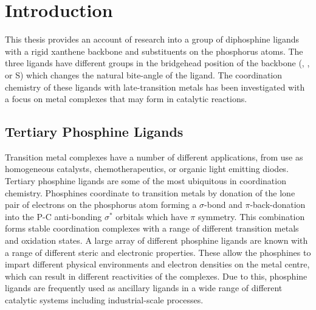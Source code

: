 
\chapter{Introduction}
\label{chapter:introduction}

This thesis provides an account of research into a group of diphosphine ligands with a rigid xanthene backbone and \tBu{} substituents on the phosphorus atoms.  The three ligands have different groups in the bridgehead position of the backbone (, , or S) which changes the natural bite-angle of the ligand.  The coordination chemistry of these \tBuxantphos{} ligands with late-transition metals has been investigated with a focus on metal complexes that may form in catalytic reactions.




\section{Tertiary Phosphine Ligands}

Transition metal complexes have a number of different applications, from use as homogeneous catalysts, chemotherapeutics, or organic light emitting diodes.\cite{Lamansky2001, Rosenberg1969, Wilson2013}  Tertiary phosphine ligands are some of the most ubiquitous in coordination chemistry.  Phosphines coordinate to transition metals by donation of the lone pair of electrons on the phosphorus atom forming a $\sigma$-bond and $\pi$-back-donation into the P-C anti-bonding $\sigma^*$ orbitals which have $\pi$ symmetry.\cite{Orpen1990}  This combination forms stable coordination complexes with a range of different transition metals and oxidation states.  A large array of different phosphine ligands are known with a range of different steric and electronic properties.  These allow the phosphines to impart different physical environments and electron densities on the metal centre, which can result in different reactivities of the complexes.  Due to this, phosphine ligands are frequently used as ancillary ligands in a wide range of different catalytic systems including industrial-scale processes.\cite{Noyori2002, Nicolaou2005, Knowles2002}


